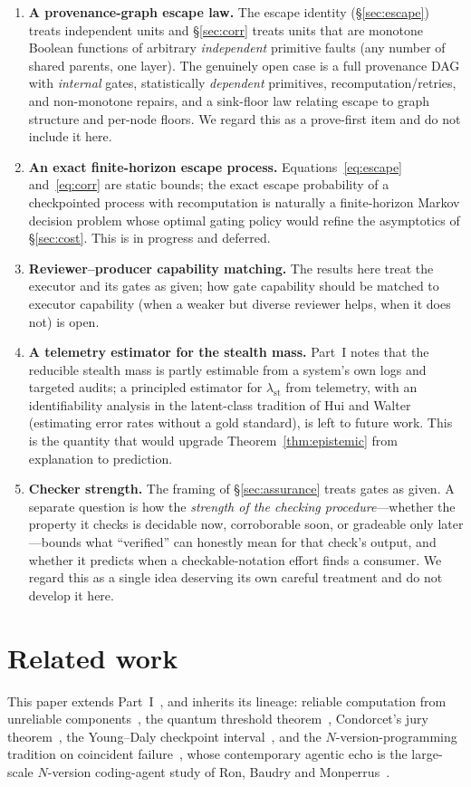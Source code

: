 \documentclass[11pt]{article}
\theoremstyle{definition}
\theoremstyle{remark}
\newcommand{\lst}{\lambda_{\mathrm{st}}}
\begin{document}
\begin{enumerate}[leftmargin=1.6em,itemsep=3pt]
\item \textbf{A provenance-graph escape law.} The escape identity (\S\ref{sec:escape}) treats
independent units and \S\ref{sec:corr} treats units that are monotone Boolean functions of arbitrary
\emph{independent} primitive faults (any number of shared parents, one layer). The genuinely open case
is a full provenance DAG with \emph{internal} gates, statistically \emph{dependent} primitives,
recomputation/retries, and non-monotone repairs, and a sink-floor law relating escape to graph
structure and per-node floors. We regard this as a prove-first item and do not include it here.
\item \textbf{An exact finite-horizon escape process.} Equations~\eqref{eq:escape}
and~\eqref{eq:corr} are static bounds; the exact escape probability of a checkpointed process with
recomputation is naturally a finite-horizon Markov decision problem whose optimal gating policy would
refine the asymptotics of \S\ref{sec:cost}. This is in progress and deferred.
\item \textbf{Reviewer--producer capability matching.} The results here treat the executor and its
gates as given; how gate capability should be matched to executor capability (when a weaker but
diverse reviewer helps, when it does not) is open.
\item \textbf{A telemetry estimator for the stealth mass.} Part~I notes that the reducible stealth
mass is partly estimable from a system's own logs and targeted audits; a principled estimator for
$\lst$ from telemetry, with an identifiability analysis in the latent-class tradition of Hui and
Walter~\cite{huiwalter1980} (estimating error rates without a gold standard), is left to future work.
This is the quantity that would upgrade Theorem~\ref{thm:epistemic} from explanation to prediction.
\item \textbf{Checker strength.} The framing of \S\ref{sec:assurance} treats gates as given. A separate
question is how the \emph{strength of the checking procedure}---whether the property it checks is
decidable now, corroborable soon, or gradeable only later---bounds what ``verified'' can honestly mean
for that check's output, and whether it predicts when a checkable-notation effort finds a consumer. We
regard this as a single idea deserving its own careful treatment and do not develop it here.
\end{enumerate}

\section{Related work}\label{sec:related}
This paper extends Part~I~\cite{matijasevic2026n1}, and inherits its lineage: reliable computation
from unreliable components~\cite{vonneumann1956,moore1956}, the quantum threshold
theorem~\cite{aharonov1997}, Condorcet's jury theorem~\cite{condorcet1785}, the Young--Daly
checkpoint interval~\cite{young1974,daly2006}, and the $N$-version-programming tradition on coincident
failure~\cite{eckhardt1985,littlewood1989,knight1986}, whose contemporary agentic echo is the
large-scale $N$-version coding-agent study of Ron, Baudry and Monperrus~\cite{ron2026}.
\end{document}
